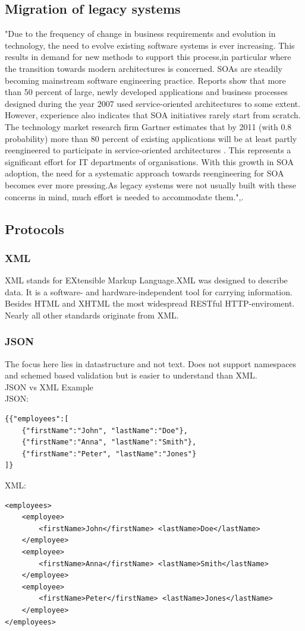 \documentclass[12pt]{article}
\begin{document}
\subsection{Migration of legacy systems}
"Due to the frequency of change in business requirements and evolution in technology, the need
to evolve existing software systems is ever increasing. This results in demand for new methods
to support this process,in particular where the transition towards modern architectures is concerned.
SOAs are steadily becoming mainstream software engineering practice. Reports show that
more than 50 percent of large, newly developed applications and business processes designed during
the year 2007 used service-oriented architectures to some extent. However, experience
also indicates that SOA initiatives rarely start from scratch. The technology market research firm
Gartner estimates that by 2011 (with 0.8 probability) more than 80 percent of existing applications will
be at least partly reengineered to participate in service-oriented architectures . This
represents a significant effort for IT departments of organisations.
With this growth in SOA adoption, the need for a systematic approach towards reengineering
for SOA becomes ever more pressing.As legacy systems were not usually built with these concerns in mind, 
much effort is needed to accommodate them.",\cite{legacy}.
\\
\subsection{Protocols}

\subsubsection{XML}
XML stands for EXtensible Markup Language.XML was designed to describe data.
It is a software- and hardware-independent tool for carrying information.\\
Besides HTML and XHTML the most widespread RESTful HTTP-enviroment.\\
Nearly all other standards originate from XML.
\subsubsection{JSON}
The focus here lies in datastructure and not text.
Does not support namespaces and schemed based validation but is easier to understand
than XML.\\
JSON vs XML Example\\
JSON:
\begin{lstlisting}
{{"employees":[
    {"firstName":"John", "lastName":"Doe"}, 
    {"firstName":"Anna", "lastName":"Smith"},
    {"firstName":"Peter", "lastName":"Jones"}
]}
\end{lstlisting}
XML:
\begin{lstlisting}
<employees>
    <employee>
        <firstName>John</firstName> <lastName>Doe</lastName>
    </employee>
    <employee>
        <firstName>Anna</firstName> <lastName>Smith</lastName>
    </employee>
    <employee>
        <firstName>Peter</firstName> <lastName>Jones</lastName>
    </employee>
</employees>
\end{lstlisting}
\end{document}

